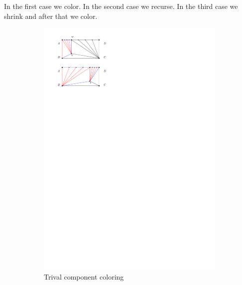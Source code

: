 In the first case we color. In the second case we recurse. In the third case we shrink and after that we color.

\begin{figure}
    \centering
    \begin{subfigure}[b]{0.45 \textwidth}
        \includegraphics[width = \textwidth]{chordShrink/img/trivialColoring}
        \caption{Trival component coloring}
        \label{fig:chord:trivialColoring}
    \end{subfigure}
    ~
    \begin{subfigure}[b]{0.45 \textwidth}

\end{subfigure}
\end{figure}

